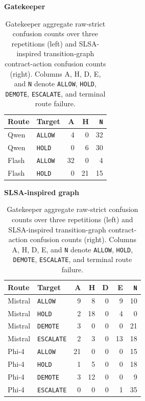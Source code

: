 \documentclass[10pt]{article}
\newcommand{\allow}{\texttt{ALLOW}}
\newcommand{\hold}{\texttt{HOLD}}
\newcommand{\demote}{\texttt{DEMOTE}}
\newcommand{\escalate}{\texttt{ESCALATE}}
\begin{document}
\begin{table}[htbp]
\centering
\footnotesize
\setlength{\tabcolsep}{3.5pt}
\caption{Gatekeeper aggregate raw-strict confusion counts over three repetitions (left) and
SLSA-inspired transition-graph contract-action confusion counts (right). Columns A, H, D, E, and
\texttt{N} denote \allow{}, \hold{}, \demote{}, \escalate{}, and terminal route failure.}
\label{tab:gate-confusion}
\label{tab:graph-confusion}
\begin{minipage}[t]{0.31\textwidth}
\centering
\textbf{Gatekeeper}\par\smallskip
\begin{tabular}{@{}llrrr@{}}
\toprule
Route & Target & A & H & \texttt{N} \\
\midrule
Qwen & \allow{} & 4 & 0 & 32 \\
Qwen & \hold{} & 0 & 6 & 30 \\
Flash & \allow{} & 32 & 0 & 4 \\
Flash & \hold{} & 0 & 21 & 15 \\
\bottomrule
\end{tabular}
\end{minipage}\hfill
\begin{minipage}[t]{0.65\textwidth}
\centering
\textbf{SLSA-inspired graph}\par\smallskip
\begin{tabular}{@{}llrrrrr@{}}
\toprule
Route & Target & A & H & D & E & \texttt{N} \\
\midrule
Mistral & \allow{} & 9 & 8 & 0 & 9 & 10 \\
Mistral & \hold{} & 2 & 18 & 0 & 4 & 0 \\
Mistral & \demote{} & 3 & 0 & 0 & 0 & 21 \\
Mistral & \escalate{} & 2 & 3 & 0 & 13 & 18 \\
\midrule
Phi-4 & \allow{} & 21 & 0 & 0 & 0 & 15 \\
Phi-4 & \hold{} & 1 & 5 & 0 & 0 & 18 \\
Phi-4 & \demote{} & 3 & 12 & 0 & 0 & 9 \\
Phi-4 & \escalate{} & 0 & 0 & 0 & 1 & 35 \\
\bottomrule
\end{tabular}
\end{minipage}
\end{table}
\end{document}

